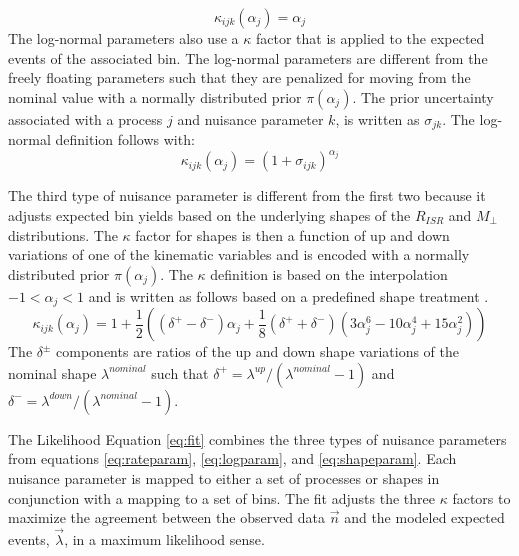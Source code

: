 \begin{equation}
\label{eq:rateparam}
\kappa_{ijk}(\alpha_j) = \alpha_j
\end{equation}  
The log-normal parameters also use a $\kappa$ factor that is applied to the expected events of the associated bin. The log-normal parameters are different from the freely floating parameters such that they are penalized for moving from the nominal value with a normally distributed prior $\pi(\alpha_j)$. The prior uncertainty associated with a process $j$ and nuisance parameter $k$, is written as $\sigma_{jk}$. The log-normal definition follows with:
\begin{equation}
\label{eq:logparam}
\kappa_{ijk}(\alpha_j) = (1+\sigma_{ijk})^{\alpha_j}
\end{equation}

The third type of nuisance parameter is different from the first two because it adjusts expected bin yields based on the underlying shapes of the $R_{ISR}$ and $M_\perp$ distributions. The $\kappa$ factor for shapes is then a function of up and down variations of one of the kinematic variables and is encoded with a normally distributed prior $\pi(\alpha_j)$. The $\kappa$ definition is based on the interpolation $-1<\alpha_j<1$ and is written as follows based on a predefined shape treatment \cite{Conway:2011in}.
\begin{equation}
\label{eq:shapeparam}
\kappa_{ijk}(\alpha_j)= 1 + \frac{1}{2}((\delta^+ - \delta^-)\alpha_j + \frac{1}{8}(\delta^+ + \delta^-)(3\alpha_j^6-10\alpha_j^4+15\alpha_j^2))
\end{equation}
The $\delta^\pm$ components are ratios of the up and down shape variations of the nominal shape $\lambda^{nominal}$ such that $\delta^+ = \lambda^{up}/(\lambda^{nominal}-1)$ and $\delta^- = \lambda^{down}/(\lambda^{nominal}-1).$

The Likelihood Equation \ref{eq:fit} combines the three types of nuisance parameters from equations \ref{eq:rateparam}, \ref{eq:logparam}, and \ref{eq:shapeparam}. Each nuisance parameter is mapped to either a set of processes or shapes in conjunction with a mapping to a set of bins. The fit adjusts the three $\kappa$ factors to maximize the agreement between the observed data $\vec{n}$ and the modeled expected events, $\vec{\lambda}$, in a maximum likelihood sense. 


